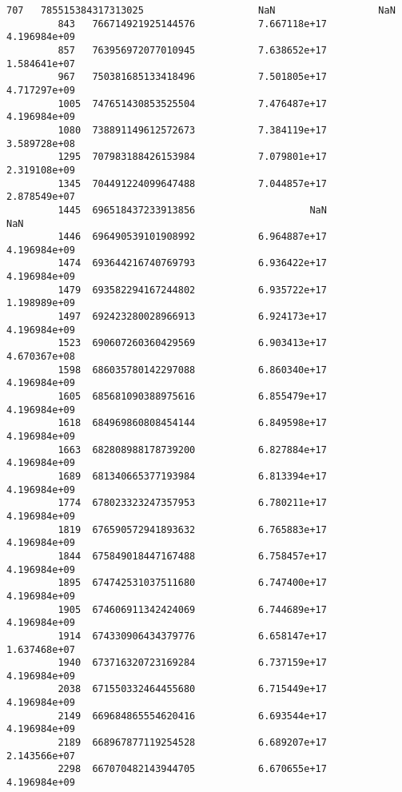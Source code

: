 \documentclass[11pt]{article}
\begin{document}
\begin{Verbatim}[commandchars=\\\{\}]
         707   785515384317313025                    NaN                  NaN   
         843   766714921925144576           7.667118e+17         4.196984e+09   
         857   763956972077010945           7.638652e+17         1.584641e+07   
         967   750381685133418496           7.501805e+17         4.717297e+09   
         1005  747651430853525504           7.476487e+17         4.196984e+09   
         1080  738891149612572673           7.384119e+17         3.589728e+08   
         1295  707983188426153984           7.079801e+17         2.319108e+09   
         1345  704491224099647488           7.044857e+17         2.878549e+07   
         1445  696518437233913856                    NaN                  NaN   
         1446  696490539101908992           6.964887e+17         4.196984e+09   
         1474  693644216740769793           6.936422e+17         4.196984e+09   
         1479  693582294167244802           6.935722e+17         1.198989e+09   
         1497  692423280028966913           6.924173e+17         4.196984e+09   
         1523  690607260360429569           6.903413e+17         4.670367e+08   
         1598  686035780142297088           6.860340e+17         4.196984e+09   
         1605  685681090388975616           6.855479e+17         4.196984e+09   
         1618  684969860808454144           6.849598e+17         4.196984e+09   
         1663  682808988178739200           6.827884e+17         4.196984e+09   
         1689  681340665377193984           6.813394e+17         4.196984e+09   
         1774  678023323247357953           6.780211e+17         4.196984e+09   
         1819  676590572941893632           6.765883e+17         4.196984e+09   
         1844  675849018447167488           6.758457e+17         4.196984e+09   
         1895  674742531037511680           6.747400e+17         4.196984e+09   
         1905  674606911342424069           6.744689e+17         4.196984e+09   
         1914  674330906434379776           6.658147e+17         1.637468e+07   
         1940  673716320723169284           6.737159e+17         4.196984e+09   
         2038  671550332464455680           6.715449e+17         4.196984e+09   
         2149  669684865554620416           6.693544e+17         4.196984e+09   
         2189  668967877119254528           6.689207e+17         2.143566e+07   
         2298  667070482143944705           6.670655e+17         4.196984e+09   
         

\end{Verbatim}
\end{document}
